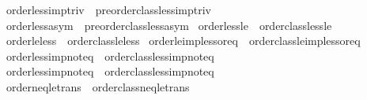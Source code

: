 \begin{isabellebody}
\isamarkupfalse%
\ order{\isacharunderscore}{\kern0pt}less{\isacharunderscore}{\kern0pt}imp{\isacharunderscore}{\kern0pt}triv\ {\isacharequal}{\kern0pt}\ preorder{\isacharunderscore}{\kern0pt}class{\isachardot}{\kern0pt}less{\isacharunderscore}{\kern0pt}imp{\isacharunderscore}{\kern0pt}triv\isanewline
{}\isamarkupfalse%
\ order{\isacharunderscore}{\kern0pt}less{\isacharunderscore}{\kern0pt}asym{\isacharprime}{\kern0pt}\ {\isacharequal}{\kern0pt}\ preorder{\isacharunderscore}{\kern0pt}class{\isachardot}{\kern0pt}less{\isacharunderscore}{\kern0pt}asym{\isacharprime}{\kern0pt}\isanewline
\isanewline
{}\isamarkupfalse%
\ order{\isacharunderscore}{\kern0pt}less{\isacharunderscore}{\kern0pt}le\ {\isacharequal}{\kern0pt}\ order{\isacharunderscore}{\kern0pt}class{\isachardot}{\kern0pt}less{\isacharunderscore}{\kern0pt}le\isanewline
{}\isamarkupfalse%
\ order{\isacharunderscore}{\kern0pt}le{\isacharunderscore}{\kern0pt}less\ {\isacharequal}{\kern0pt}\ order{\isacharunderscore}{\kern0pt}class{\isachardot}{\kern0pt}le{\isacharunderscore}{\kern0pt}less\isanewline
{}\isamarkupfalse%
\ order{\isacharunderscore}{\kern0pt}le{\isacharunderscore}{\kern0pt}imp{\isacharunderscore}{\kern0pt}less{\isacharunderscore}{\kern0pt}or{\isacharunderscore}{\kern0pt}eq\ {\isacharequal}{\kern0pt}\ order{\isacharunderscore}{\kern0pt}class{\isachardot}{\kern0pt}le{\isacharunderscore}{\kern0pt}imp{\isacharunderscore}{\kern0pt}less{\isacharunderscore}{\kern0pt}or{\isacharunderscore}{\kern0pt}eq\isanewline
{}\isamarkupfalse%
\ order{\isacharunderscore}{\kern0pt}less{\isacharunderscore}{\kern0pt}imp{\isacharunderscore}{\kern0pt}not{\isacharunderscore}{\kern0pt}eq\ {\isacharequal}{\kern0pt}\ order{\isacharunderscore}{\kern0pt}class{\isachardot}{\kern0pt}less{\isacharunderscore}{\kern0pt}imp{\isacharunderscore}{\kern0pt}not{\isacharunderscore}{\kern0pt}eq\isanewline
{}\isamarkupfalse%
\ order{\isacharunderscore}{\kern0pt}less{\isacharunderscore}{\kern0pt}imp{\isacharunderscore}{\kern0pt}not{\isacharunderscore}{\kern0pt}eq{}\ {\isacharequal}{\kern0pt}\ order{\isacharunderscore}{\kern0pt}class{\isachardot}{\kern0pt}less{\isacharunderscore}{\kern0pt}imp{\isacharunderscore}{\kern0pt}not{\isacharunderscore}{\kern0pt}eq{}\isanewline
{}\isamarkupfalse%
\ order{\isacharunderscore}{\kern0pt}neq{\isacharunderscore}{\kern0pt}le{\isacharunderscore}{\kern0pt}trans\ {\isacharequal}{\kern0pt}\ order{\isacharunderscore}{\kern0pt}class{\isachardot}{\kern0pt}neq{\isacharunderscore}{\kern0pt}le{\isacharunderscore}{\kern0pt}trans\isanewline

\end{isabellebody}
